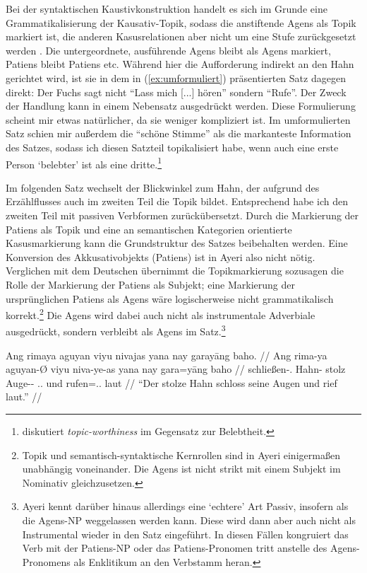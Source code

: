 \documentclass[12pt,paper=a4]{scrartcl}
\newcommand{\TsgM}{{\Tsg}.{\M}}
\newcommand{\fw}[1]{\textit{#1}} %
\begin{document}
Bei der syntaktischen Kaustivkonstruktion handelt es sich im Grunde eine Grammatikalisierung der Kausativ-Topik, sodass die anstiftende Agens als Topik markiert ist, die anderen Kasusrelationen aber nicht um eine Stufe zurückgesetzt werden \autocite[vgl.][Kap. 8.2]{comrie1989}. Die untergeordnete, ausführende Agens bleibt als Agens markiert, Patiens bleibt Patiens etc. Während hier die Aufforderung indirekt an den Hahn gerichtet wird, ist sie in dem in (\ref{ex:umformuliert}) präsentierten Satz dagegen direkt: Der Fuchs sagt nicht \enquote{Lass mich [...] hören} sondern \enquote{Rufe}. Der Zweck der Handlung kann in einem Nebensatz ausgedrückt werden. Diese Formulierung scheint mir etwas natürlicher, da sie weniger kompliziert ist. Im umformulierten Satz schien mir außerdem die \enquote{schöne Stimme} als die markanteste Information des Satzes, sodass ich diesen Satzteil topikalisiert habe, wenn auch eine erste Person \enquote*{belebter} ist als eine dritte.\footnote{\textcite[197--199]{comrie1989} diskutiert \fw{topic-worthiness} im Gegensatz zur Belebtheit.}

Im folgenden Satz wechselt der Blickwinkel zum Hahn, der aufgrund des Erzählflusses auch im zweiten Teil die Topik bildet. Entsprechend habe ich den zweiten Teil mit passiven Verbformen zurückübersetzt. Durch die Markierung der Patiens als Topik und eine an semantischen Kategorien orientierte Kasusmarkierung kann die Grundstruktur des Satzes beibehalten werden. Eine Konversion des Akkusativobjekts (Patiens) ist in Ayeri also nicht nötig. Verglichen mit dem Deutschen übernimmt die Topikmarkierung sozusagen die Rolle der Markierung der Patiens als Subjekt; eine Markierung der ursprünglichen Patiens als Agens wäre logischerweise nicht grammatikalisch korrekt.\footnote{Topik und semantisch-syntaktische Kernrollen sind in Ayeri einigermaßen unabhängig voneinander. Die Agens ist nicht strikt mit einem Subjekt im Nominativ gleichzusetzen.} Die Agens wird dabei auch nicht als instrumentale Adverbiale ausgedrückt, sondern verbleibt als Agens im Satz.\footnote{Ayeri kennt darüber hinaus allerdings eine \enquote*{echtere} Art Passiv, insofern als die Agens-NP weggelassen werden kann. Diese wird dann aber auch nicht als Instrumental wieder in den Satz eingeführt. In diesen Fällen kongruiert das Verb mit der Patiens-NP oder das Patiens-Pronomen tritt anstelle des Agens-Pronomens als Enklitikum an den Verbstamm heran.}

\pex %
\a\label{ex:itrvb}\begingl
	\gla Ang rimaya aguyan viyu nivajas yana nay garayāng baho. //
	\glb Ang rima-ya aguyan-Ø viyu niva-ye-as yana nay gara=yāng baho //
	\glc \AgtT{} schließen-\TsgM{} Hahn-\Top{} stolz Auge-\Pl{}-\Parg{} \TsgM{}.\Gen{} und rufen=\TsgM{}.\Aarg{} laut //
	\glft \enquote{Der stolze Hahn schloss seine Augen und rief laut.} //
\endgl
\end{document}
